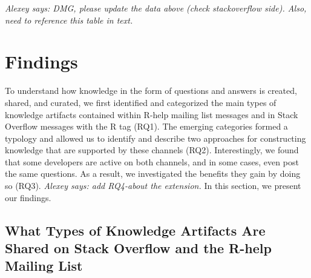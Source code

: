 \documentclass[smallextended]{svjour3}       %
\newcommand{\alexey}[1]{{\color{cyan}\emph{Alexey says: #1}}\xspace}
\newcommand{\alexey}[1]{}
\newcommand{\SO}{Stack Overflow\xspace}
\newcommand{\RH}{R-help\xspace}
\begin{document}
\alexey{DMG, please update the data above (check stackoverflow side). Also, need to reference this table in text.}



 \section{Findings}
\label{cha:findings}
To understand how knowledge in the form of questions and answers is created, shared, and curated, we first identified and categorized the main types of knowledge artifacts contained within \RH mailing list messages and in \SO messages with the R tag (RQ1). The emerging categories formed a typology and allowed us to identify and describe two approaches for constructing knowledge that are supported by these channels (RQ2). Interestingly, we found that some developers are active on both channels, and in some cases, even post the same questions. As a result, we investigated the benefits they gain by doing so (RQ3). \alexey{add RQ4-about the extension.} In this section, we present our findings.

\subsection{What Types of Knowledge Artifacts Are Shared on \SO and the \RH Mailing List}
\label{cha:findings-types}
\end{document}
